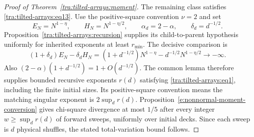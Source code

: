 \begin{proof}[Proof of Theorem~\ref{tra:tilted-arrays:moment}]
The remaining class satisfies \eqref{tra:tilted-arrays:eq13}.
Use the positive-square convention $\nu=2$ and set
\[
 E_N=N^{1-\eta},\qquad H_N=N^{1-\eta/2},\qquad
 \alpha_d=2-\alpha,\qquad\delta_d=d^{-1/2}.
\]
Proposition~\ref{tra:tilted-arrays:recursion} supplies its child-to-parent
hypothesis uniformly for inherited exponents at least $r_{\min}$.
The decisive comparison is
\[
 (1+\delta_d)E_N-\delta_dH_N
 =(1+d^{-1/2})N^{1-\eta}-d^{-1/2}N^{1-\eta/2}
 \longrightarrow-\infty.
\]
Also $(2-\alpha)(1+d^{-1/2})=1+O(d^{-1/2})$.
The common lemma therefore supplies bounded recursive exponents
$r(d)$ satisfying \eqref{tra:tilted-arrays:eq1}, including the finite
initial sizes.
\label{tra:tilted-arrays:fourier-completion}
Its positive-square convention means the matching singular exponent is
$2\sup_d r(d)$. Proposition~\ref{e:nonnormal-moment-conversion} gives
chi-square divergence at most $1/5$ after every integer
$w\ge\sup_d r(d)$ of forward sweeps, uniformly over initial decks.
Since each sweep is $d$ physical shuffles, the stated total-variation
bound follows.
\end{proof}
